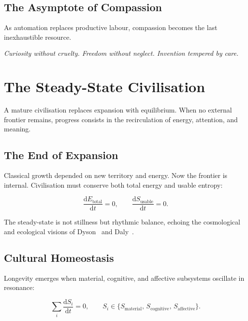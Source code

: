 \documentclass[12pt,a4paper]{article}
\theoremstyle{definition}
\newcommand{\ddt}[1]{\frac{\mathrm{d}#1}{\mathrm{d}t}}
\begin{document}
\subsection{The Asymptote of Compassion}

As automation replaces productive labour, compassion becomes the last
inexhaustible resource.

\medskip
\begin{center}
  \itshape
  Curiosity without cruelty.\quad
  Freedom without neglect.\quad
  Invention tempered by care.
\end{center}

\section{The Steady-State Civilisation}

A mature civilisation replaces expansion with equilibrium.  When no external
frontier remains, progress consists in the recirculation of energy, attention,
and meaning.

\subsection{The End of Expansion}

Classical growth depended on new territory and energy.  Now the frontier is
internal.  Civilisation must conserve both total energy and usable entropy:

\begin{equation}
  \ddt{E_{\mathrm{total}}} = 0, \qquad
  \ddt{S_{\mathrm{usable}}} = 0.
\end{equation}

The steady-state is not stillness but rhythmic balance, echoing the cosmological
and ecological visions of Dyson~\citeyearpar{dyson1979} and
Daly~\citeyearpar{daly2020}.

\subsection{Cultural Homeostasis}

Longevity emerges when material, cognitive, and affective subsystems oscillate
in resonance:

\begin{equation}
  \sum_i \ddt{S_i} = 0, \qquad
  S_i \in \{S_{\mathrm{material}},\, S_{\mathrm{cognitive}},\,
             S_{\mathrm{affective}}\}.
\end{equation}
\end{document}
